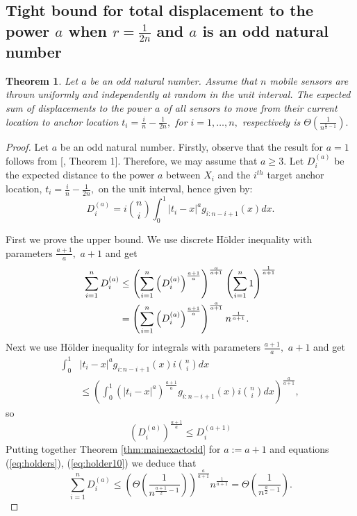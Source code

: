 \documentclass[final,5p,times,twocolumn]{elsarticle_mod}
\newtheorem{theorem}{Theorem}
\begin{document}
\subsection{Tight bound for total displacement to the power $a$ when $r=\frac{1}{2n}$ and $a$ is an odd natural number}
\begin{theorem} 
\label{thm:mainexact_oddtwo} 
Let $a$ be an odd natural number. Assume that $n$ mobile sensors are thrown uniformly and independently at random in the unit interval. The expected sum
of displacements to the power $a$ of all sensors to move from their current location to anchor location $t_i=\frac{i}{n}-\frac{1}{2n},$
for $i=1,\dots,n,$ respectively is $\Theta\left(\frac{1}{n^{\frac{a}{2}-1}}\right).$
\end{theorem}
\begin{proof} Let $a$ be an odd natural number.
Firstly, observe that the result for $a=1$ follows from [\cite{spa_2013}, Theorem 1]. Therefore, we may assume that $a\ge 3.$
Let $D_i^{(a)}$ be the expected distance to the power $a$ between $X_i$ and the $i^{th}$ target anchor location, $t_i=\frac{i}{n}-\frac{1}{2n},$ on the
unit interval, hence given by:
$$
        D_i^{(a)}=i\binom{n}{i}\int_{0}^{1}|t_i-x|^ag_{i:n-i+1}(x)dx.
$$

First we prove the upper bound.
We use discrete H\"older inequality with parameters $\frac{a+1}{a},$  $a+1$
and get
\begin{align}
\sum_{i=1}^{n}D^{(a)}_i\notag
&\le
\left(\sum_{i=1}^{n}\left(D^{(a)}_i\right)^{\frac{a+1}{a}}\right)^{\frac{a}{a+1}}
\left(\sum_{i=1}^{n}1\right)^{\frac{1}{a+1}}\\
&=  \label{eq:holders}
\left(\sum_{i=1}^{n}\left(D^{(a)}_i\right)^{\frac{a+1}{a}}\right)^{\frac{a}{a+1}}
n^{\frac{1}{a+1}}.
\end{align}
Next we use H\"older inequality for integrals with parameters $\frac{a+1}{a},$  $a+1$ and get
\begin{align*}
\int_0^1&|t_i-x|^ag_{i:n-i+1}(x)i\binom{n}{i}dx\\
&\le \left(\int_0^1\left(|t_i-x|^a\right)^{\frac{a+1}{a}}g_{i:n-i+1}(x)i\binom{n}{i}dx\right)^{\frac{a}{a+1}},
\end{align*}
so 
\begin{equation}
\label{eq:holder10}
\left(D^{(a)}_i\right)^{\frac{a+1}{a}}\le D^{(a+1)}_i
\end{equation}
Putting together Theorem \ref{thm:mainexactodd} for $a:=a+1$ and equations (\ref{eq:holders}), (\ref{eq:holder10}) we deduce that
$$
\sum_{i=1}^{n}D^{(a)}_i\le\left(\Theta\left(\frac{1}{n^{\frac{a+1}{2}-1}}\right)\right)^{\frac{a}{a+1}}
n^{\frac{1}{a+1}}=\Theta\left(\frac{1}{n^{\frac{a }{2}-1}}\right).
$$


\end{proof}
\end{document}
